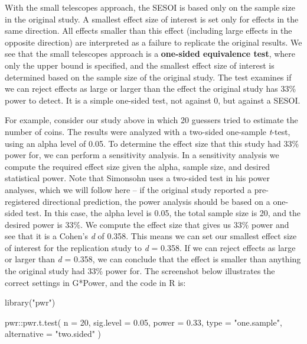 \documentclass[
  oneside]{krantz}
\makeatletter
\newenvironment{Shaded}{\begin{snugshade}}{\end{snugshade}}
\newcommand{\AttributeTok}[1]{\textcolor[rgb]{0.61,0.61,0.61}{#1}}
\newcommand{\DecValTok}[1]{\textcolor[rgb]{0.06,0.06,0.06}{#1}}
\newcommand{\FloatTok}[1]{\textcolor[rgb]{0.06,0.06,0.06}{#1}}
\newcommand{\FunctionTok}[1]{\textcolor[rgb]{0,0,0}{#1}}
\newcommand{\NormalTok}[1]{#1}
\newcommand{\SpecialCharTok}[1]{\textcolor[rgb]{0,0,0}{#1}}
\newcommand{\StringTok}[1]{\textcolor[rgb]{0.5,0.5,0.5}{#1}}
\newenvironment{kframe}{%
\medskip{}
\setlength{\fboxsep}{.8em}
 \def\at@end@of@kframe{}%
 \ifinner\ifhmode%
  \def\at@end@of@kframe{\end{minipage}}%
  \begin{minipage}{\columnwidth}%
 \fi\fi%
 \def\FrameCommand##1{\hskip\@totalleftmargin \hskip-\fboxsep
 \colorbox{shadecolor}{##1}\hskip-\fboxsep
     \hskip-\linewidth \hskip-\@totalleftmargin \hskip\columnwidth}%
 \MakeFramed {\advance\hsize-\width
   \@totalleftmargin\z@ \linewidth\hsize
   \@setminipage}}%
 {\par\unskip\endMakeFramed%
 \at@end@of@kframe}
\renewenvironment{Shaded}{\begin{kframe}}{\end{kframe}}
\makeatother
\begin{document}
With the small telescopes approach, the SESOI is based only on the sample size in the original study. A smallest effect size of interest is set only for effects in the same direction. All effects smaller than this effect (including large effects in the opposite direction) are interpreted as a failure to replicate the original results. We see that the small telescopes approach is a \textbf{one-sided equivalence test}, where only the upper bound is specified, and the smallest effect size of interest is determined based on the sample size of the original study. The test examines if we can reject effects as large or larger than the effect the original study has 33\% power to detect. It is a simple one-sided test, not against 0, but against a SESOI.

For example, consider our study above in which 20 guessers tried to estimate the number of coins. The results were analyzed with a two-sided one-sample \emph{t}-test, using an alpha level of 0.05. To determine the effect size that this study had 33\% power for, we can perform a sensitivity analysis. In a sensitivity analysis we compute the required effect size given the alpha, sample size, and desired statistical power. Note that Simonsohn uses a two-sided test in his power analyses, which we will follow here -- if the original study reported a pre-registered directional prediction, the power analysis should be based on a one-sided test. In this case, the alpha level is 0.05, the total sample size is 20, and the desired power is 33\%. We compute the effect size that gives us 33\% power and see that it is a Cohen's \emph{d} of 0.358. This means we can set our smallest effect size of interest for the replication study to \emph{d} = 0.358. If we can reject effects as large or larger than \emph{d} = 0.358, we can conclude that the effect is smaller than anything the original study had 33\% power for. The screenshot below illustrates the correct settings in G*Power, and the code in R is:

\begin{Shaded}
\begin{Highlighting}[]
\FunctionTok{library}\NormalTok{(}\StringTok{"pwr"}\NormalTok{)}

\NormalTok{pwr}\SpecialCharTok{::}\FunctionTok{pwr.t.test}\NormalTok{(}
  \AttributeTok{n =} \DecValTok{20}\NormalTok{, }
  \AttributeTok{sig.level =} \FloatTok{0.05}\NormalTok{, }
  \AttributeTok{power =} \FloatTok{0.33}\NormalTok{, }
  \AttributeTok{type =} \StringTok{"one.sample"}\NormalTok{,}
  \AttributeTok{alternative =} \StringTok{"two.sided"}
\NormalTok{)}
\end{Highlighting}
\end{Shaded}
\end{document}

